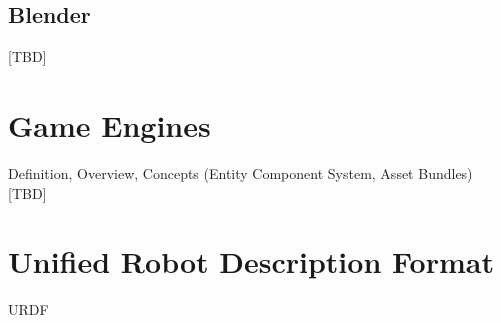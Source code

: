\subsection{Blender}
[TBD]

\section{Game Engines}
Definition, Overview, Concepts (Entity Component System, Asset Bundles) [TBD]

\section{Unified Robot Description Format}
\ac{URDF}